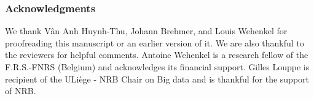 \documentclass[twoside]{article}
\begin{document}





\subsubsection*{Acknowledgments}
We thank Vân Anh Huynh-Thu, Johann Brehmer, and Louis Wehenkel for proofreading this manuscript or an earlier version of it. We are also thankful to the reviewers for helpful comments. Antoine Wehenkel is a research fellow of the F.R.S.-FNRS (Belgium) and acknowledges its financial support. Gilles Louppe is recipient of the ULiège - NRB Chair on Big data and is
thankful for the support of NRB.

\clearpage
\appendix
\onecolumn

\end{document}
